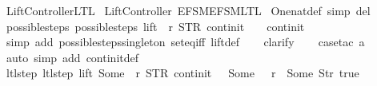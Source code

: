 %
\begin{isabellebody}%
%
%
\isadelimtheory
%
\endisadelimtheory
%
\isatagtheory
{}\isamarkupfalse%
\ Lift{\isacharunderscore}Controller{\isacharunderscore}LTL\isanewline
{}\ Lift{\isacharunderscore}Controller\ {\isachardoublequoteopen}EFSM{\isachardot}EFSM{\isacharunderscore}LTL{\isachardoublequoteclose}\isanewline
{}%
\endisatagtheory
{\isafoldtheory}%
%
\isadelimtheory
\isanewline
%
\endisadelimtheory
\isanewline
{}\isamarkupfalse%
\ One{\isacharunderscore}nat{\isacharunderscore}def\ {\isacharbrackleft}simp\ del{\isacharbrackright}\isanewline
\isanewline
{}\isamarkupfalse%
\ possible{\isacharunderscore}steps{\isacharunderscore}{}{\isacharcolon}\ {\isachardoublequoteopen}possible{\isacharunderscore}steps\ lift\ {}\ r\ STR\ {\isacharprime}{\isacharprime}continit{\isacharprime}{\isacharprime}\ {\isacharbrackleft}{\isacharbrackright}\ {\isacharequal}\ {\isacharbraceleft}{\isacharbar}{\isacharparenleft}{}{\isacharcomma}\ continit{\isacharparenright}{\isacharbar}{\isacharbraceright}{\isachardoublequoteclose}\isanewline
%
\isadelimproof
\ \ %
\endisadelimproof
%
\isatagproof
{}\isamarkupfalse%
\ {\isacharparenleft}simp\ add{\isacharcolon}\ possible{\isacharunderscore}steps{\isacharunderscore}singleton\ set{\isacharunderscore}eq{\isacharunderscore}iff\ lift{\isacharunderscore}def{\isacharparenright}\isanewline
\ \ \isamarkupfalse%
\ clarify\isanewline
\ \ \isamarkupfalse%
\ {\isacharparenleft}case{\isacharunderscore}tac\ {\isachardoublequoteopen}a{\isacharequal}{}{\isachardoublequoteclose}{\isacharparenright}\isanewline
\ \ \isamarkupfalse%
\ {\isacharparenleft}auto\ simp\ add{\isacharcolon}\ continit{\isacharunderscore}def{\isacharparenright}%
\endisatagproof
{\isafoldproof}%
%
\isadelimproof
\isanewline
%
\endisadelimproof
\isanewline
{}\isamarkupfalse%
\ ltl{\isacharunderscore}step{\isacharunderscore}{}{\isacharcolon}\ {\isachardoublequoteopen}ltl{\isacharunderscore}step\ lift\ {\isacharparenleft}Some\ {}{\isacharparenright}\ r\ {\isacharparenleft}STR\ {\isacharprime}{\isacharprime}continit{\isacharprime}{\isacharprime}{\isacharcomma}\ {\isacharbrackleft}{\isacharbrackright}{\isacharparenright}\ {\isacharequal}\ {\isacharparenleft}Some\ {}{\isacharcomma}\ {\isacharbrackleft}{\isacharbrackright}{\isacharcomma}\ r{\isacharparenleft}{}\ {\isachardollar}{\isacharcolon}{\isacharequal}\ Some\ {\isacharparenleft}Str\ {\isacharprime}{\isacharprime}true{\isacharprime}{\isacharprime}{\isacharparenright}{\isacharparenright}{\isacharparenright}{\isachardoublequoteclose}\isanewline

\end{isabellebody}
